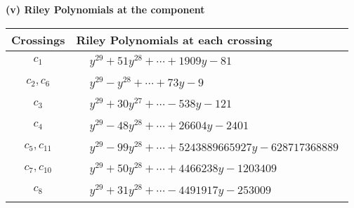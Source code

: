 \documentclass[1p]{elsarticle_modified}
\theoremstyle{definition}
\begin{document}
\newpage\renewcommand{\arraystretch}{1}
\flushleft \textbf{(v) Riley Polynomials at the component}\newline \\
\begin{tabular}{m{50pt}|m{274pt}}
Crossings & \hspace{64pt}Riley Polynomials at each crossing \\
\hline $$\begin{aligned}c_{1}\end{aligned}$$&$\begin{aligned}
&y^{29}+51 y^{28}+\cdots+1909 y-81
\end{aligned}$\\
\hline $$\begin{aligned}c_{2},c_{6}\end{aligned}$$&$\begin{aligned}
&y^{29}- y^{28}+\cdots+73 y-9
\end{aligned}$\\
\hline $$\begin{aligned}c_{3}\end{aligned}$$&$\begin{aligned}
&y^{29}+30 y^{27}+\cdots-538 y-121
\end{aligned}$\\
\hline $$\begin{aligned}c_{4}\end{aligned}$$&$\begin{aligned}
&y^{29}-48 y^{28}+\cdots+26604 y-2401
\end{aligned}$\\
\hline $$\begin{aligned}c_{5},c_{11}\end{aligned}$$&$\begin{aligned}
&y^{29}-99 y^{28}+\cdots+5243889665927 y-628717368889
\end{aligned}$\\
\hline $$\begin{aligned}c_{7},c_{10}\end{aligned}$$&$\begin{aligned}
&y^{29}+50 y^{28}+\cdots+4466238 y-1203409
\end{aligned}$\\
\hline $$\begin{aligned}c_{8}\end{aligned}$$&$\begin{aligned}
&y^{29}+31 y^{28}+\cdots-4491917 y-253009
\end{aligned}$\\

\end{tabular}
\end{document}
